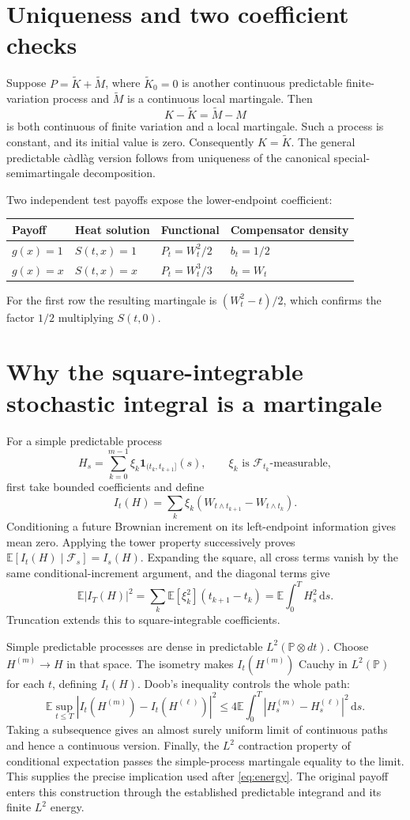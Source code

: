 \documentclass[11pt,letterpaper]{article}
\newcommand{\E}{\mathbb E}
\newcommand{\Pbb}{\mathbb P}
\newcommand{\F}{\mathcal F}
\newcommand{\dd}{\,\mathrm d}
\newcommand{\ind}{\mathbf1}
\begin{document}
\section{Uniqueness and two coefficient checks}
Suppose $P=\widetilde K+\widetilde M$, where $\widetilde K_0=0$ is another continuous predictable finite-variation process and $\widetilde M$ is a continuous local martingale. Then
\[
K-\widetilde K=\widetilde M-M
\]
is both continuous of finite variation and a local martingale. Such a process is constant, and its initial value is zero. Consequently $K=\widetilde K$. The general predictable c\`adl\`ag version follows from uniqueness of the canonical special-semimartingale decomposition.

Two independent test payoffs expose the lower-endpoint coefficient:
\begin{center}
\begin{tabularx}{\linewidth}{@{}lXXX@{}}\toprule
Payoff & Heat solution & Functional & Compensator density\\\midrule
$g(x)=1$ & $S(t,x)=1$ & $P_t=W_t^2/2$ & $b_t=1/2$\\
$g(x)=x$ & $S(t,x)=x$ & $P_t=W_t^3/3$ & $b_t=W_t$\\\bottomrule
\end{tabularx}
\end{center}
For the first row the resulting martingale is $(W_t^2-t)/2$, which confirms the factor $1/2$ multiplying $S(t,0)$.

\section{Why the square-integrable stochastic integral is a martingale}\label{sec:L2construction}
For a simple predictable process
\[
H_s=\sum_{k=0}^{m-1}\xi_k\ind_{(t_k,t_{k+1}]}(s),
\qquad \xi_k\text{ is }\F_{t_k}\text{-measurable},
\]
first take bounded coefficients and define
\[
I_t(H)=\sum_k\xi_k(W_{t\wedge t_{k+1}}-W_{t\wedge t_k}).
\]
Conditioning a future Brownian increment on its left-endpoint information gives mean zero. Applying the tower property successively proves $\E[I_t(H)\mid\F_s]=I_s(H)$. Expanding the square, all cross terms vanish by the same conditional-increment argument, and the diagonal terms give
\[
\E|I_T(H)|^2=\sum_k\E[\xi_k^2](t_{k+1}-t_k)
=\E\int_0^TH_s^2\dd s.
\]
Truncation extends this to square-integrable coefficients.

Simple predictable processes are dense in predictable $L^2(\Pbb\otimes dt)$. Choose $H^{(m)}\to H$ in that space. The isometry makes $I_t(H^{(m)})$ Cauchy in $L^2(\Pbb)$ for each $t$, defining $I_t(H)$. Doob's inequality controls the whole path:
\[
\E\sup_{t\le T}|I_t(H^{(m)})-I_t(H^{(\ell)})|^2
\le4\E\int_0^T|H_s^{(m)}-H_s^{(\ell)}|^2\dd s.
\]
Taking a subsequence gives an almost surely uniform limit of continuous paths and hence a continuous version. Finally, the $L^2$ contraction property of conditional expectation passes the simple-process martingale equality to the limit. This supplies the precise implication used after \eqref{eq:energy}. The original payoff enters this construction through the established predictable integrand and its finite $L^2$ energy.
\end{document}
